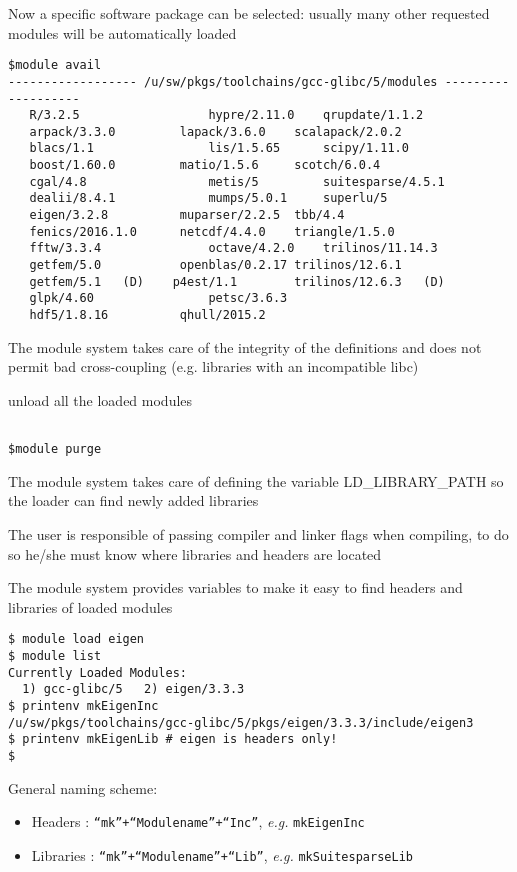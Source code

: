 \documentclass[9pt]{beamer}
\begin{document}
\begin{frame}[fragile]
Now a specific software package can be selected: usually many other requested modules will be automatically loaded
\begin{verbatim}
$module avail
------------------ /u/sw/pkgs/toolchains/gcc-glibc/5/modules -------------------
   R/3.2.5            		hypre/2.11.0   	qrupdate/1.1.2
   arpack/3.3.0       	lapack/3.6.0   	scalapack/2.0.2
   blacs/1.1          		lis/1.5.65     	scipy/1.11.0
   boost/1.60.0       	matio/1.5.6    	scotch/6.0.4
   cgal/4.8           		metis/5        	suitesparse/4.5.1
   dealii/8.4.1       		mumps/5.0.1    	superlu/5
   eigen/3.2.8        	muparser/2.2.5 	tbb/4.4
   fenics/2016.1.0    	netcdf/4.4.0   	triangle/1.5.0
   fftw/3.3.4         		octave/4.2.0   	trilinos/11.14.3
   getfem/5.0         	openblas/0.2.17	trilinos/12.6.1
   getfem/5.1  	(D)	   p4est/1.1      	trilinos/12.6.3   (D)
   glpk/4.60          		petsc/3.6.3
   hdf5/1.8.16        	qhull/2015.2
   \end{verbatim}

The module system takes care of the integrity of the definitions and does not permit bad cross-coupling (e.g. libraries with an incompatible libc)

unload all the loaded modules
\begin{verbatim}

$module purge
\end{verbatim}
\end{frame}


\begin{frame}[fragile]

The module system takes care of defining the variable LD\_LIBRARY\_PATH so the loader can find newly added libraries

The user is responsible of passing compiler and linker flags when compiling, to do so he/she must know where libraries and headers are located

The module system provides variables to make it easy to find headers and libraries of loaded modules

\begin{verbatim}
$ module load eigen
$ module list
Currently Loaded Modules:
  1) gcc-glibc/5   2) eigen/3.3.3
$ printenv mkEigenInc
/u/sw/pkgs/toolchains/gcc-glibc/5/pkgs/eigen/3.3.3/include/eigen3
$ printenv mkEigenLib # eigen is headers only!
$ 
\end{verbatim}

General naming scheme: 
\begin{itemize}
\item Headers : {\tt ``mk''+``Modulename''+``Inc''}, {\it e.g.} {\tt mkEigenInc}
\item Libraries : {\tt ``mk''+``Modulename''+``Lib''}, {\it e.g.} {\tt mkSuitesparseLib}
\end{itemize}
\end{frame}
\end{document}
